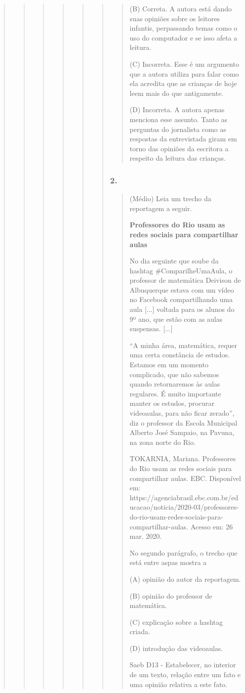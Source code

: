 \begin{quote}
\begin{quote}
\begin{quote}
\begin{quote}
\begin{quote}
\begin{quote}
\begin{quote}
(B) Correta. A autora está dando suas opiniões sobre os leitores
infantis, perpassando temas como o uso do computador e se isso afeta a
leitura.

(C) Incorreta. Esse é um argumento que a autora utiliza para falar como
ela acredita que as crianças de hoje leem mais do que antigamente.

(D) Incorreta. A autora apenas menciona esse assunto. Tanto as perguntas
do jornalista como as respostas da entrevistada giram em torno das
opiniões da escritora a respeito da leitura das crianças.
\end{quote}

\subsubsection{2. }\label{section-64}

\begin{quote}
(Médio) Leia um trecho da reportagem a seguir.

\textbf{Professores do Rio usam as redes sociais para compartilhar
aulas}

No dia seguinte que soube da hashtag \#ComparilheUmaAula, o professor de
matemática Deivison de Albuquerque estava com um vídeo no Facebook
compartilhando uma aula {[}...{]} voltada para os alunos do 9º ano, que
estão com as aulas suspensas. {[}...{]}

``A minha área, matemática, requer uma certa constância de estudos.
Estamos em um momento complicado, que não sabemos quando retornaremos às
aulas regulares. É muito importante manter os estudos, procurar
videoaulas, para não ficar zerado'', diz o professor da Escola Municipal
Alberto José Sampaio, na Pavuna, na zona norte do Rio.

TOKARNIA, Mariana. Professores do Rio usam as redes sociais para
compartilhar aulas. EBC. Disponível em:
https://agenciabrasil.ebc.com.br/educacao/noticia/2020-03/professores-do-rio-usam-redes-sociais-para-compartilhar-aulas.
Acesso em: 26 mar. 2020.

\protect\hypertarget{_Hlk128058360}{}{}No segundo parágrafo, o trecho
que está entre aspas mostra a

(A) opinião do autor da reportagem.

(B) opinião do professor de matemática.

(C) explicação sobre a hashtag criada.

(D) introdução das videoaulas.

Saeb D13 - Estabelecer, no interior de um texto, relação entre um fato e
uma opinião relativa a este fato.


\end{quote}
\end{quote}
\end{quote}
\end{quote}
\end{quote}
\end{quote}
\end{quote}
